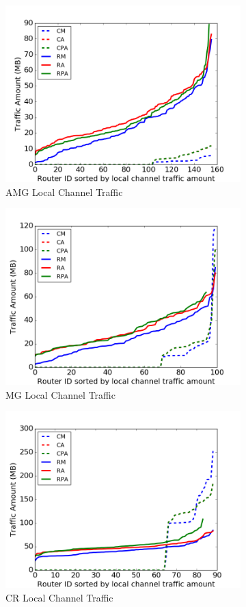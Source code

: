 \documentclass[conference,compsoc]{IEEEtran}
\begin{document}
\begin{figure}[t]
    \centering
    \begin{subfigure}[t]{0.32\textwidth}
        \centering
        \includegraphics[height=1.8 in]{wkld/amg/lc-traffic}
        \caption{AMG Local Channel Traffic}
        \label{fig:amg-lc-traffic}
    \end{subfigure}\hfill
    \hspace{1em}%
    \begin{subfigure}[t]{0.32\textwidth}
        \centering
        \includegraphics[height=1.8 in]{wkld/mg/lc-traffic}
        \caption{MG Local Channel Traffic}
        \label{fig:mg-lc-traffic}
    \end{subfigure}\hfill
    \begin{subfigure}[t]{0.32\textwidth}
        \centering
        \includegraphics[height=1.8 in]{wkld/cr/lc-traffic}
        \caption{CR Local Channel Traffic}
        \label{fig:cr-lc-traffic}
    \end{subfigure}\\
    \centering
    \begin{subfigure}[t]{0.32\textwidth}
        \centering

\end{subfigure}
\end{figure}
\end{document}
